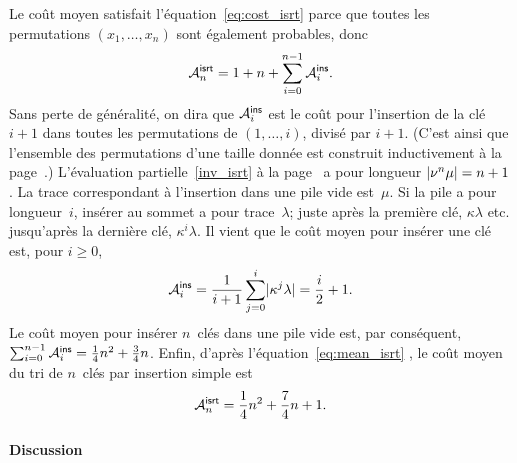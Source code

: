 Le coût moyen satisfait l'équation~\eqref{eq:cost_isrt} parce que
toutes les permutations \((x_1,\dots,x_n)\) sont également probables, donc
\begin{equation}
\M{\fun{isrt}}{n} = 1 + n + \sum_{i=0}^{n-1}\M{\fun{ins}}{i}.
\label{eq:mean_isrt}
\end{equation}
Sans perte de généralité, on dira que
\(\M{\fun{ins}}{i}\) est le coût pour
l'insertion de la clé \(i+1\) dans toutes les permutations de
\((1,\dots,i)\), divisé par \(i+1\). (C'est ainsi que l'ensemble des
permutations d'une taille donnée est construit
inductivement à la page~\pageref{par:permutations}.) L'évaluation
partielle~\eqref{inv_isrt} à la page~\pageref{inv_isrt} a pour longueur
\(\len{\nu^n\mu}=n+1\). La trace correspondant à l'insertion dans une
pile vide est~\(\mu\). Si la pile a pour longueur~\(i\), insérer au
sommet a pour trace~\(\lambda\); juste après la première clé,
\(\kappa\lambda\) etc. jusqu'après la dernière clé,
\(\kappa^i\lambda\). Il vient que le coût moyen pour insérer une clé
est, pour \(i \geqslant 0\),
\begin{equation}
\M{\fun{ins}}{i} = \frac{1}{i+1}\sum_{j=0}^{i}\len{\kappa^j\lambda}
                 = \frac{i}{2}+1.
\label{eq:ins}
\end{equation}
Le coût moyen pour insérer \(n\)~clés dans une pile vide est, par
conséquent, \(\sum_{i=0}^{n-1}\M{\fun{ins}}{i} = \frac{1}{4}n^2 +
\frac{3}{4}n\). Enfin, d'après l'équation~\eqref{eq:mean_isrt}
, le coût moyen du tri de \(n\)~clés par
insertion simple est
\begin{equation*}
\M{\fun{isrt}}{n} = \frac{1}{4}n^2 + \frac{7}{4}n + 1.
\end{equation*}

\paragraph{Discussion}

